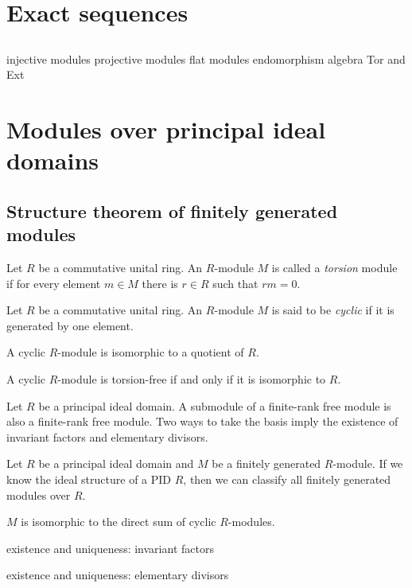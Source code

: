 \documentclass{../../large}
\begin{document}
\chapter{Exact sequences}
\section{}
injective modules
projective modules
flat modules
endomorphism algebra
Tor and Ext






\chapter{Modules over principal ideal domains}
\section{Structure theorem of finitely generated modules}

\begin{prb}
Let $R$ be a commutative unital ring.
An $R$-module $M$ is called a \emph{torsion} module if
for every element $m\in M$ there is $r\in R$ such that $rm=0$.
\end{prb}

\begin{prb}
Let $R$ be a commutative unital ring.
An $R$-module $M$ is said to be \emph{cyclic} if it is generated by one element.
\begin{parts}
\item A cyclic $R$-module is isomorphic to a quotient of $R$.
\item A cyclic $R$-module is torsion-free if and only if it is isomorphic to $R$.
\end{parts}
\end{prb}

\begin{prb}
Let $R$ be a principal ideal domain.
A submodule of a finite-rank free module is also a finite-rank free module.
Two ways to take the basis imply the existence of invariant factors and elementary divisors.
\end{prb}

\begin{prb}
Let $R$ be a principal ideal domain and $M$ be a finitely generated $R$-module.
If we know the ideal structure of a PID $R$, then we can classify all finitely generated modules over $R$.
\begin{parts}
\item $M$ is isomorphic to the direct sum of cyclic $R$-modules.
\item existence and uniqueness: invariant factors
\item existence and uniqueness: elementary divisors
\end{parts}
\end{prb}
\end{document}
